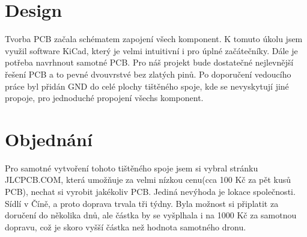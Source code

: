 \section{Design}
    Tvorba PCB začala schématem zapojení všech komponent. K tomuto úkolu jsem využil software KiCad, který je velmi intuitivní i pro úplné začátečníky. Dále je potřeba navrhnout samotné PCB. Pro náš projekt bude dostatečné nejlevnější řešení PCB a to pevné dvouvrstvé bez zlatých pinů. Po doporučení vedoucího práce byl přidán GND do celé plochy tištěného spoje, kde se nevyskytují jiné propoje, pro jednoduché propojení všechs komponent. 

\section{Objednání}
    Pro samotné vytvoření tohoto tištěného spoje jsem si vybral stránku JLCPCB.COM, která umožňuje za velmi nízkou cenu(cca 100 Kč za pět kusů PCB), nechat si vyrobit jakékoliv PCB. Jediná nevýhoda je lokace společnosti. Sídlí v Číně, a proto doprava trvala tři týdny. Byla možnost si připlatit za doručení do několika dnů, ale částka by se vyšplhala i na 1000 Kč za samotnou dopravu, což je skoro vyšší částka než hodnota samotného dronu.
